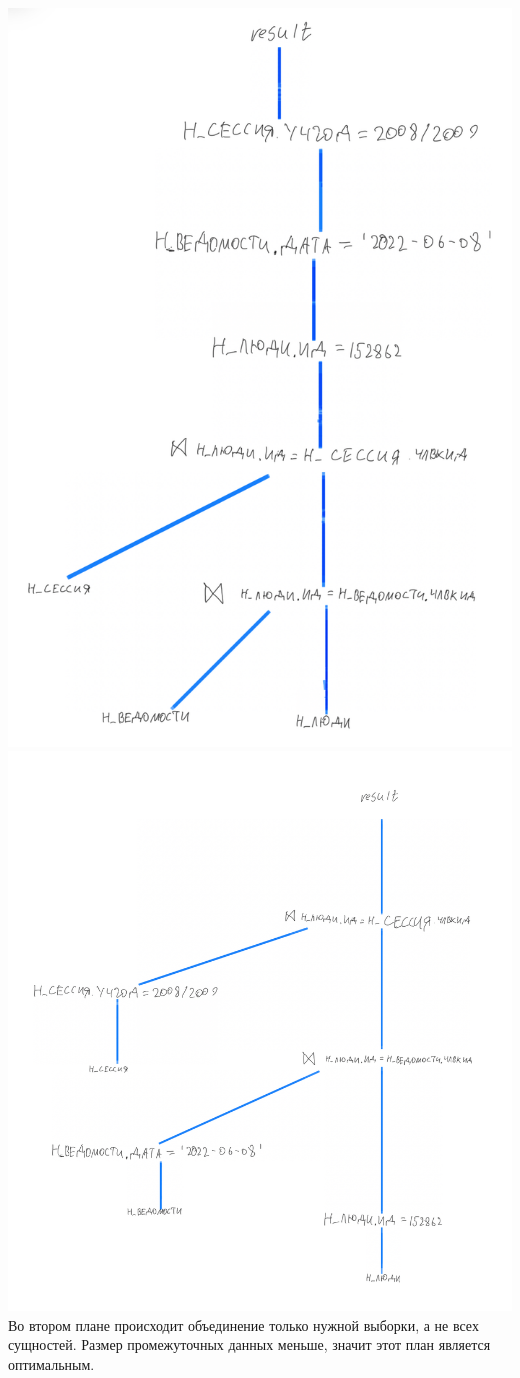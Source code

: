 \includegraphics[scale=0.1]{img/3B3F657C-4110-4AE6-A736-745C403307F1_1_201_a}
\includegraphics[scale=0.1]{img/1FE77B51-B421-4DC9-AFD1-15045EC0057A_1_201_a}
Во втором плане происходит объединение только нужной выборки, а не всех сущностей. Размер промежуточных данных меньше, значит этот план является оптимальным.
